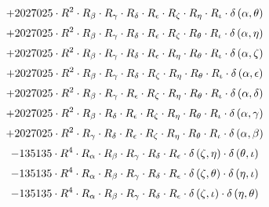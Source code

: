 \begin{subequations}
\begin{gather}
 \\[0.2em] \notag 		 + 2027025 \cdot R^{2} \cdot R_{\beta{}} \cdot R_{\gamma{}} \cdot R_{\delta{}} \cdot R_{\epsilon{}} \cdot R_{\zeta{}} \cdot R_{\eta{}} \cdot R_{\iota{}} \cdot \delta{}\left(\alpha{}, \theta{}\right) 
 \\[0.2em] \notag 		 + 2027025 \cdot R^{2} \cdot R_{\beta{}} \cdot R_{\gamma{}} \cdot R_{\delta{}} \cdot R_{\epsilon{}} \cdot R_{\zeta{}} \cdot R_{\theta{}} \cdot R_{\iota{}} \cdot \delta{}\left(\alpha{}, \eta{}\right) 
 \\[0.2em] \notag 		 + 2027025 \cdot R^{2} \cdot R_{\beta{}} \cdot R_{\gamma{}} \cdot R_{\delta{}} \cdot R_{\epsilon{}} \cdot R_{\eta{}} \cdot R_{\theta{}} \cdot R_{\iota{}} \cdot \delta{}\left(\alpha{}, \zeta{}\right) 
 \\[0.2em] \notag 		 + 2027025 \cdot R^{2} \cdot R_{\beta{}} \cdot R_{\gamma{}} \cdot R_{\delta{}} \cdot R_{\zeta{}} \cdot R_{\eta{}} \cdot R_{\theta{}} \cdot R_{\iota{}} \cdot \delta{}\left(\alpha{}, \epsilon{}\right) 
 \\[0.2em] \notag 		 + 2027025 \cdot R^{2} \cdot R_{\beta{}} \cdot R_{\gamma{}} \cdot R_{\epsilon{}} \cdot R_{\zeta{}} \cdot R_{\eta{}} \cdot R_{\theta{}} \cdot R_{\iota{}} \cdot \delta{}\left(\alpha{}, \delta{}\right) 
 \\[0.2em] \notag 		 + 2027025 \cdot R^{2} \cdot R_{\beta{}} \cdot R_{\delta{}} \cdot R_{\epsilon{}} \cdot R_{\zeta{}} \cdot R_{\eta{}} \cdot R_{\theta{}} \cdot R_{\iota{}} \cdot \delta{}\left(\alpha{}, \gamma{}\right) 
 \\[0.2em] \notag 		 + 2027025 \cdot R^{2} \cdot R_{\gamma{}} \cdot R_{\delta{}} \cdot R_{\epsilon{}} \cdot R_{\zeta{}} \cdot R_{\eta{}} \cdot R_{\theta{}} \cdot R_{\iota{}} \cdot \delta{}\left(\alpha{}, \beta{}\right) 
 \\[0.2em] \notag 		 - 135135 \cdot R^{4} \cdot R_{\alpha{}} \cdot R_{\beta{}} \cdot R_{\gamma{}} \cdot R_{\delta{}} \cdot R_{\epsilon{}} \cdot \delta{}\left(\zeta{}, \eta{}\right) \cdot \delta{}\left(\theta{}, \iota{}\right) 
 \\[0.2em] \notag 		 - 135135 \cdot R^{4} \cdot R_{\alpha{}} \cdot R_{\beta{}} \cdot R_{\gamma{}} \cdot R_{\delta{}} \cdot R_{\epsilon{}} \cdot \delta{}\left(\zeta{}, \theta{}\right) \cdot \delta{}\left(\eta{}, \iota{}\right) 
 \\[0.2em] \notag 		 - 135135 \cdot R^{4} \cdot R_{\alpha{}} \cdot R_{\beta{}} \cdot R_{\gamma{}} \cdot R_{\delta{}} \cdot R_{\epsilon{}} \cdot \delta{}\left(\zeta{}, \iota{}\right) \cdot \delta{}\left(\eta{}, \theta{}\right) 

\end{gather}
\end{subequations}
